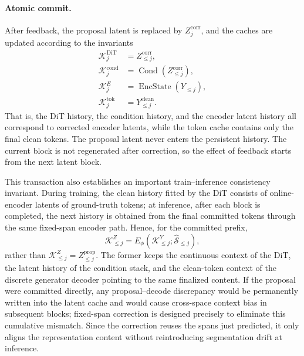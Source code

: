 \paragraph{Atomic commit.}
After feedback, the proposal latent is replaced by $Z_j^{\mathrm{corr}}$, and the caches are updated according to the invariants
\begin{equation}
\begin{aligned}
    \mathcal K^{\mathrm{DiT}}_j
    &=Z^{\mathrm{corr}}_{\le j},\\
    \mathcal K^{\mathrm{cond}}_j
    &=\operatorname{Cond}(Z^{\mathrm{corr}}_{\le j}),\\
    \mathcal K^{E}_j
    &=\operatorname{EncState}(Y_{\le j}),\\
    \mathcal K^{\mathrm{tok}}_j
    &=Y^{\mathrm{clean}}_{\le j}.
\end{aligned}
\label{eq:app-workflow-cache-invariant}
\end{equation}
That is, the DiT history, the condition history, and the encoder latent history all correspond to corrected encoder latents, while the token cache contains only the final clean tokens. The proposal latent never enters the persistent history. The current block is not regenerated after correction, so the effect of feedback starts from the next latent block.

This transaction also establishes an important train--inference consistency invariant. During training, the clean history fitted by the DiT consists of online-encoder latents of ground-truth tokens; at inference, after each block is completed, the next history is obtained from the final committed tokens through the same fixed-span encoder path. Hence, for the committed prefix,
\begin{equation}
    \mathcal K^{Z}_{\le j}
    =E_\phi\!\left(\mathcal K^{Y}_{\le j};\widehat{\mathcal S}_{\le j}\right),
    \label{eq:app-workflow-context-alignment}
\end{equation}
rather than $\mathcal K^Z_{\le j}=Z^{\mathrm{prop}}_{\le j}$. The former keeps the continuous context of the DiT, the latent history of the condition stack, and the clean-token context of the discrete generator decoder pointing to the same finalized content. If the proposal were committed directly, any proposal--decode discrepancy would be permanently written into the latent cache and would cause cross-space context bias in subsequent blocks; fixed-span correction is designed precisely to eliminate this cumulative mismatch. Since the correction reuses the spans just predicted, it only aligns the representation content without reintroducing segmentation drift at inference.


